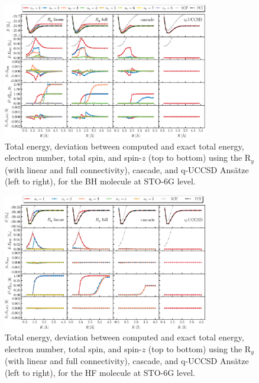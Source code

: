 \documentclass[aps,pra,twocolumn]{revtex4-2}
\begin{document}
\begin{figure}[t!]
\includegraphics[width=0.8\textwidth]{../figures/second_quantization_bh/second_quantization_bh.eps}
\caption{Total energy, deviation between computed and exact total energy, electron number, total spin, and spin-$z$ (top to bottom) 
using the R$_y$ (with linear and full connectivity), cascade, and q-UCCSD Ans\"{a}tze (left to right), for the BH molecule at STO-6G level.}
\label{figure:second_bh}
\end{figure}

\begin{figure}[t!]
\includegraphics[width=0.8\textwidth]{../figures/second_quantization_hf/second_quantization_hf.eps}
\caption{Total energy, deviation between computed and exact total energy, electron number, total spin, and spin-$z$ (top to bottom) 
using the R$_y$ (with linear and full connectivity), cascade, and q-UCCSD Ans\"{a}tze (left to right), for the HF molecule at STO-6G level.}
\label{figure:second_hf}
\end{figure}
\end{document}
